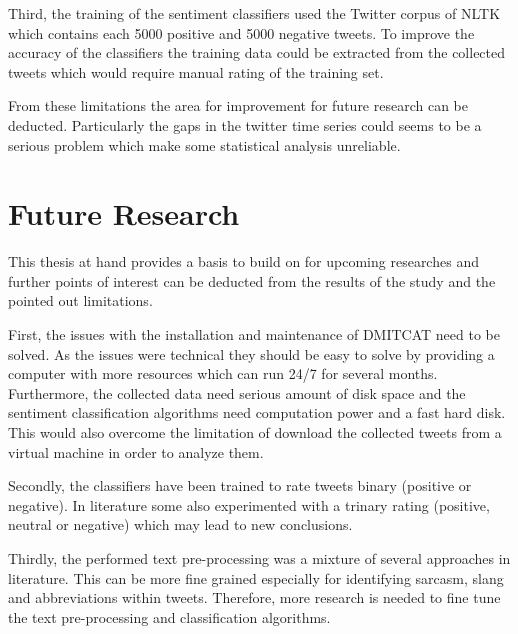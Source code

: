 Third, the training of the sentiment classifiers used the Twitter corpus of \ac{NLTK} which contains each 5000 positive and 5000 negative tweets.
To improve the accuracy of the classifiers the training data could be extracted from the collected tweets which would require manual rating of the training set.

From these limitations the area for improvement for future research can be deducted.
Particularly the gaps in the twitter time series could seems to be a serious problem which make some statistical analysis unreliable.

\section{Future Research}
\label{s:conclusions-future}


This thesis at hand provides a basis to build on for upcoming researches and further points of interest can be deducted from the results of the study and the pointed out limitations.

First, the issues with the installation and maintenance of \ac{DMITCAT} need to be solved.
As the issues were technical they should be easy to solve by providing a computer with more resources which can run 24/7 for several months.
Furthermore, the collected data need serious amount of disk space and the sentiment classification algorithms need computation power and a fast hard disk.
This would also overcome the limitation of download the collected tweets from a virtual machine in order to analyze them.

Secondly, the classifiers have been trained to rate tweets binary (positive or negative).
In literature some also experimented with a trinary rating (positive, neutral or negative) which may lead to new conclusions.

Thirdly, the performed text pre-processing was a mixture of several approaches in literature.
This can be more fine grained especially for identifying sarcasm, slang and abbreviations within tweets.
Therefore, more research is needed to fine tune the text pre-processing and classification algorithms.